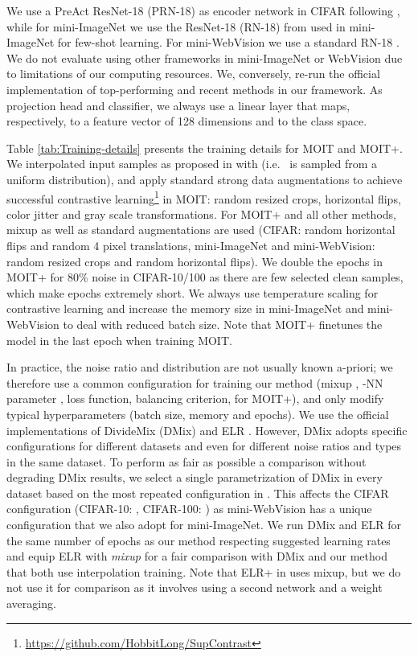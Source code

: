 \documentclass[final]{cvpr}
\begin{document}
We use a PreAct ResNet-18 (PRN-18) \cite{2016_ECCV_PreActResNet} as encoder network in CIFAR following \cite{2019_ICML_DynamicBootstrapping}, while for mini-ImageNet we use the ResNet-18 (RN-18) from \cite{2020_arXiv_ResNetFewShot} used in mini-ImageNet for few-shot learning. For mini-WebVision we use a standard RN-18 \cite{2016_CVPR_ResNet}. We do not evaluate using other frameworks in mini-ImageNet or WebVision \cite{2020_ICML_DatasetOOD,2020_ICLR_DivideMix} due to limitations of our computing resources. We, conversely, re-run the official implementation of top-performing and recent methods \cite{2018_ICLR_mixup,2020_ICLR_DivideMix,2020_NeurIPS_EarlyReg} in our framework. As projection head and classifier, we always use a linear layer that maps, respectively, to a feature vector  of 128 dimensions and to the class space.

Table \ref{tab:Training-details} presents the training details for MOIT and MOIT+. We interpolated input samples as proposed in \cite{2018_ICLR_mixup} with  (i.e.~ is sampled from a uniform distribution), and apply standard strong data augmentations to achieve successful contrastive learning\footnote{\url{https://github.com/HobbitLong/SupContrast}} in MOIT: random resized crops, horizontal flips, color jitter and gray scale transformations. For MOIT+ and all other methods, mixup as well as standard augmentations are used (CIFAR: random horizontal flips and random 4 pixel translations, mini-ImageNet and mini-WebVision: random resized crops and random horizontal flips). We double the epochs in MOIT+ for 80\% noise in CIFAR-10/100 as there are few selected clean samples, which make epochs extremely short. We always use  temperature scaling for contrastive learning and increase the memory size in mini-ImageNet and mini-WebVision to deal with reduced batch size. Note that MOIT+ finetunes the model in the last epoch when training MOIT.

In practice, the noise ratio and distribution are not usually known a-priori; we therefore use a common configuration for training our method (mixup , -NN parameter , loss function,  balancing criterion,  for MOIT+), and only modify typical hyperparameters (batch size, memory and epochs). We use the official implementations of DivideMix (DMix) \cite{2020_ICLR_DivideMix} and ELR \cite{2020_NeurIPS_EarlyReg}. However, DMix adopts specific configurations for different datasets and even for different noise ratios and types in the same dataset. To perform as fair as possible a comparison without degrading DMix results, we select a single parametrization of DMix in every dataset based on the most repeated configuration in \cite{2020_ICLR_DivideMix}. This affects the CIFAR configuration (CIFAR-10: , CIFAR-100: ) as mini-WebVision has a unique configuration that we also adopt for mini-ImageNet. We run DMix and ELR for the same number of epochs as our method respecting suggested learning rates and equip ELR with \textit{mixup} for a fair comparison with DMix and our method that both use interpolation training. Note that ELR+ in \cite{2020_NeurIPS_EarlyReg} uses mixup, but we do not use it for comparison as it involves using a second network and a weight averaging.
\end{document}
